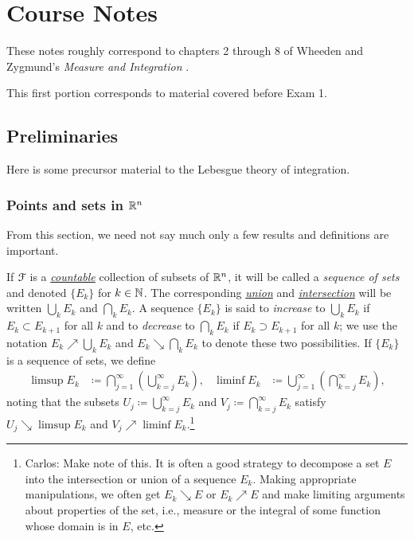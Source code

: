 \chapter{Course Notes}
\thispagestyle{empty}
These notes roughly correspond to chapters 2 through 8 of Wheeden and
Zygmund's \emph{Measure and Integration}
\cite{book:wheeden-zygmund}.

This first portion corresponds to material covered before Exam 1.
\section{Preliminaries}
Here is some precursor material to the Lebesgue theory of integration.
\subsection{Points and sets in $\mathbb{R}^n$}
From this section, we need not say much only a few results and definitions
are important.

\bigskip

If $\mathcal{F}$ is a
\href{https://en.wikipedia.org/wiki/Countable}{\emph{countable}} collection
of subsets of $\mathbb{R}^n$, it will be called a \emph{sequence of sets} and
denoted $\{E_k\}$ for $k\in\mathbb{N}$. The corresponding
\href{https://en.wikipedia.org/wiki/Union_(set_theory)}{\emph{union}} and
\href{https://en.wikipedia.org/wiki/Intersection_(set_theory)}{\emph{intersection}}
will be written $\bigcup_k E_k$ and $\bigcap_k E_k$. A sequence $\{E_k\}$
is said to \emph{increase} to $\bigcup_k E_k$ if $E_k\subset E_{k+1}$ for
all $k$ and to \emph{decrease} to $\bigcap_k E_k$ if $E_k\supset E_{k+1}$
for all $k$; we use the notation $E_k\nearrow \bigcup_k E_k$ and
$E_k\searrow\bigcap_k E_k$ to denote these two possibilities. If $\{E_k\}$
is a sequence of sets, we define
\begin{equation}
\label{eq:1:set-limsup-liminf}
\begin{aligned}
\limsup E_k
&\coloneqq\bigcap_{j=1}^\infty\left(\bigcup_{k=j}^\infty E_k\right),&
\liminf E_k&\coloneqq\bigcup_{j=1}^\infty\left(\bigcap_{k=j}^\infty E_k\right),
\end{aligned}
\end{equation}
noting that the subsets $U_j\coloneqq\bigcup_{k=j}^\infty E_k$ and
$V_j\coloneqq\bigcap_{k=j}^\infty E_k$ satisfy $U_j\searrow\limsup E_k$ and
$V_j\nearrow\liminf E_k$.\footnote{Carlos: Make note of this. It is often a
good strategy to decompose a set $E$ into the intersection or union of a
sequence $E_k$. Making appropriate manipulations, we often get $E_k\searrow
E$ or $E_k\nearrow E$ and make limiting arguments about properties of the
set, i.e., measure or the integral of some function whose domain is in $E$,
etc.}
